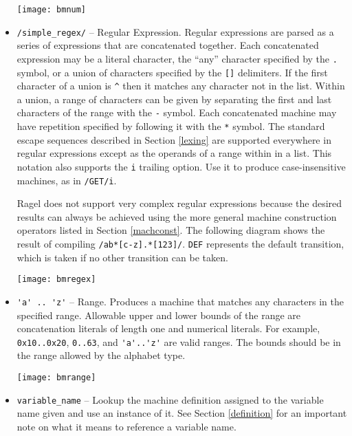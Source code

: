 \documentclass[letterpaper,11pt,oneside]{book}
\newcommand{\graphspace}{\vspace{10pt}}
\begin{document}
\begin{itemize}
\graphspace
\begin{center}
\texttt{[image: bmnum]}
\end{center}
\graphspace

\item \verb|/simple_regex/| -- Regular Expression. Regular expressions are
parsed as a series of expressions that are concatenated together. Each
concatenated expression
may be a literal character, the ``any'' character specified by the \verb|.|
symbol, or a union of characters specified by the \verb|[]| delimiters. If the
first character of a union is \verb|^| then it matches any character not in the
list. Within a union, a range of characters can be given by separating the first
and last characters of the range with the \verb|-| symbol. Each
concatenated machine may have repetition specified by following it with the
\verb|*| symbol. The standard escape sequences described in Section
\ref{lexing} are supported everywhere in regular expressions except as the
operands of a range within in a list. This notation also supports the \verb|i|
trailing option. Use it to produce case-insensitive machines, as in \verb|/GET/i|.

Ragel does not support very complex regular expressions because the desired
results can always be achieved using the more general machine construction
operators listed in Section \ref{machconst}. The following diagram shows the
result of compiling \verb|/ab*[c-z].*[123]/|. \verb|DEF| represents the default
transition, which is taken if no other transition can be taken. 


\graphspace
\begin{center}
\texttt{[image: bmregex]}
\end{center}
\graphspace

\item \verb|'a' .. 'z'| -- Range. Produces a machine that matches any
characters in the specified range.  Allowable upper and lower bounds of the
range are concatenation literals of length one and numerical literals.  For
example, \verb|0x10..0x20|, \verb|0..63|, and \verb|'a'..'z'| are valid ranges.
The bounds should be in the range allowed by the alphabet type.


\graphspace
\begin{center}
\texttt{[image: bmrange]}
\end{center}
\graphspace

\item \verb|variable_name| -- Lookup the machine definition assigned to the
variable name given and use an instance of it. See Section \ref{definition} for
an important note on what it means to reference a variable name.


\end{itemize}
\end{document}
